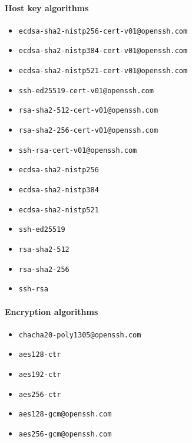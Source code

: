 \documentclass[sigconf,nonacm]{acmart}
\begin{document}
\begin{multicols}{2}

\raggedcolumns

\paragraph{Host key algorithms}

\begin{itemize}
    \item \texttt{ecdsa-sha2-nistp256-cert-v01@openssh.com}
    \item \texttt{ecdsa-sha2-nistp384-cert-v01@openssh.com}
    \item \texttt{ecdsa-sha2-nistp521-cert-v01@openssh.com}
    \item \texttt{ssh-ed25519-cert-v01@openssh.com}
    \item \texttt{rsa-sha2-512-cert-v01@openssh.com}
    \item \texttt{rsa-sha2-256-cert-v01@openssh.com}
    \item \texttt{ssh-rsa-cert-v01@openssh.com}
    \item \texttt{ecdsa-sha2-nistp256}
    \item \texttt{ecdsa-sha2-nistp384}
    \item \texttt{ecdsa-sha2-nistp521}
    \item \texttt{ssh-ed25519}
    \item \texttt{rsa-sha2-512}
    \item \texttt{rsa-sha2-256}
    \item \texttt{ssh-rsa}
\end{itemize}

\paragraph{Encryption algorithms}

\begin{itemize}
    \item \texttt{chacha20-poly1305@openssh.com}
    \item \texttt{aes128-ctr}
    \item \texttt{aes192-ctr}
    \item \texttt{aes256-ctr}
    \item \texttt{aes128-gcm@openssh.com}
    \item \texttt{aes256-gcm@openssh.com}
\end{itemize}

\columnbreak


\end{multicols}
\end{document}
